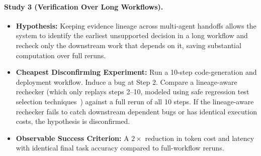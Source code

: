 \documentclass[manuscript,screen,nonacm]{acmart}
\begin{document}
\paragraph{Study 3 (Verification Over Long Workflows).}
\begin{itemize}
    \item \textbf{Hypothesis:} Keeping evidence lineage across multi-agent handoffs allows the system to identify the earliest unsupported decision in a long workflow and recheck only the downstream work that depends on it, saving substantial computation over full reruns.
    \item \textbf{Cheapest Disconfirming Experiment:} Run a 10-step code-generation and deployment workflow. Induce a bug at Step 2. Compare a lineage-aware rechecker (which only replays steps 2--10, modeled using safe regression test selection techniques~\cite{rothermel1997safe,gligoric2015practical}) against a full rerun of all 10 steps. If the lineage-aware rechecker fails to catch downstream dependent bugs or has identical execution costs, the hypothesis is disconfirmed.
    \item \textbf{Observable Success Criterion:} A $2\times$ reduction in token cost and latency with identical final task accuracy compared to full-workflow reruns.
\end{itemize}
\end{document}
